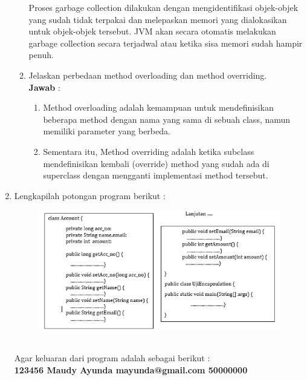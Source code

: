 \documentclass[a4paper, 12pt]{article}
\newcommand{\ans}{\textbf{Jawab} :}
\begin{document}
\begin{enumerate}
\begin{enumerate}
            Proses garbage collection dilakukan dengan mengidentifikasi objek-objek yang sudah tidak terpakai dan melepaskan memori yang dialokasikan untuk objek-objek tersebut. JVM akan secara otomatis melakukan garbage collection secara terjadwal atau ketika sisa memori sudah hampir penuh.

            \item Jelaskan perbedaan method overloading dan method overriding.\\
            
            \ans
            \begin{enumerate}[label=\textbullet]
                \item Method overloading adalah kemampuan untuk mendefinisikan beberapa method dengan nama yang sama di sebuah class, namun memiliki parameter yang berbeda.
                
                \item Sementara itu, Method overriding adalah ketika subclass mendefinisikan kembali (override) method yang sudah ada di superclass dengan mengganti implementasi method tersebut.
            \end{enumerate}
            
        \end{enumerate}

        \newpage
        \item Lengkapilah potongan program berikut :\\
        \begin{figure}[h]
            \centering
            \includegraphics[width=1\linewidth]{No2.png}
        \end{figure}\\
        Agar keluaran dari program adalah sebagai berikut :\\
        \textbf{123456 Maudy Ayunda mayunda@gmail.com 50000000}\\
        

\end{enumerate}
\end{document}
